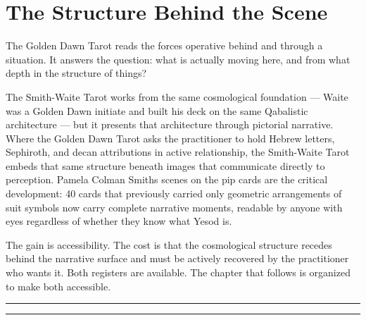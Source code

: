 \section{The Structure Behind the Scene}\label{between-chapters-one-and-two}

The Golden Dawn Tarot reads the forces operative behind and through a situation. It answers the question: what is actually moving here, and from what depth in the structure of things?

The Smith-Waite Tarot works from the same cosmological foundation --- Waite was a Golden Dawn initiate and built his deck on the same Qabalistic architecture --- but it presents that architecture through pictorial narrative. Where the Golden Dawn Tarot asks the practitioner to hold Hebrew letters, Sephiroth, and decan attributions in active relationship, the Smith-Waite Tarot embeds that same structure beneath images that communicate directly to perception. Pamela Colman Smith\textquotesingle s scenes on the pip cards are the critical development: 40 cards that previously carried only geometric arrangements of suit symbols now carry complete narrative moments, readable by anyone with eyes regardless of whether they know what Yesod is.

The gain is accessibility. The cost is that the cosmological structure recedes behind the narrative surface and must be actively recovered by the practitioner who wants it. Both registers are available. The chapter that follows is organized to make both accessible.

\begin{center}\rule{0.5\linewidth}{0.5pt}\end{center}

\begin{center}\rule{0.5\linewidth}{0.5pt}\end{center}
